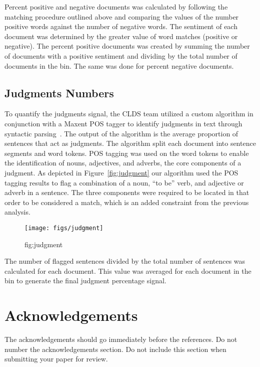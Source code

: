 \documentclass[11pt]{article}
\begin{document}
Percent positive and negative documents was calculated by following the matching procedure outlined above and comparing the values of the number positive words against the number of negative words. The sentiment of each document was determined by the greater value of word matches (positive or negative). The percent positive documents was created by summing the number of documents with a positive sentiment and dividing by the total number of documents in the bin. The same was done for percent negative documents.

\subsection{Judgments Numbers}

To quantify the judgments signal, the CLDS team utilized a custom algorithm in conjunction with a Maxent POS tagger to identify judgments in text through syntactic parsing~\cite{Hornik2011}. The output of the algorithm is the average proportion of sentences that act as judgments. The algorithm split each document into sentence segments and word tokens. POS tagging was used on the word tokens to enable the identification of nouns, adjectives, and adverbs, the core components of a judgment. As depicted in Figure~\ref{fig:judgment} our algorithm used the POS tagging results to flag a combination of a noun, “to be” verb, and adjective or adverb in a sentence. The three components were required to be located in that order to be considered a match, which is an added constraint from the previous analysis. 

\begin{figure}[ht]
\begin{center}
\texttt{[image: figs/judgment]}
\caption{fig:judgment}
\label{default}
\end{center}
\end{figure}

The number of flagged sentences divided by the total number of sentences was calculated for each document. This value was averaged for each document in the bin to generate the final judgment percentage signal.


\section*{Acknowledgements}

The acknowledgements should go immediately before the references.  Do
not number the acknowledgements section. Do not include this section
when submitting your paper for review.




\end{document}
